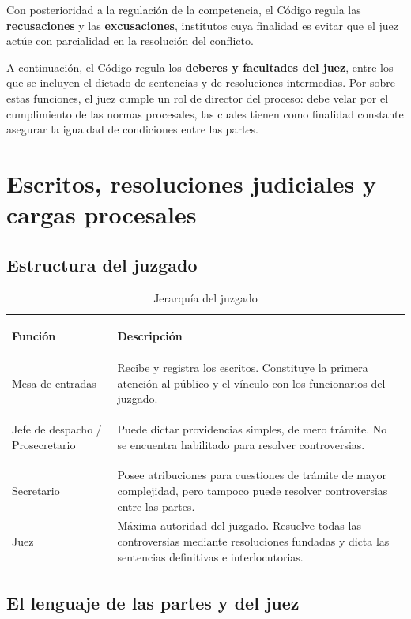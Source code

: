 \documentclass[12pt,oneside]{book}
\begin{document}
Con posterioridad a la regulación de la competencia, el Código regula las \textbf{recusaciones} y las \textbf{excusaciones}, institutos cuya finalidad es evitar que el juez actúe con parcialidad en la resolución del conflicto.

A continuación, el Código regula los \textbf{deberes y facultades del juez}, entre los que se incluyen el dictado de sentencias y de resoluciones intermedias. Por sobre estas funciones, el juez cumple un rol de director del proceso: debe velar por el cumplimiento de las normas procesales, las cuales tienen como finalidad constante asegurar la igualdad de condiciones entre las partes.

\section{Escritos, resoluciones judiciales y cargas procesales}

\subsection{Estructura del juzgado}

\begin{table}[H]
\centering
\caption{Jerarquía del juzgado}
\begin{tabularx}{\textwidth}{>{\bfseries\raggedright\arraybackslash}p{} X}
\toprule
Función & Descripción \\
\midrule
Mesa de entradas & Recibe y registra los escritos. Constituye la primera atención al público y el vínculo con los funcionarios del juzgado. \\
Jefe de despacho / Prosecretario & Puede dictar providencias simples, de mero trámite. No se encuentra habilitado para resolver controversias. \\
Secretario & Posee atribuciones para cuestiones de trámite de mayor complejidad, pero tampoco puede resolver controversias entre las partes. \\
Juez & Máxima autoridad del juzgado. Resuelve todas las controversias mediante resoluciones fundadas y dicta las sentencias definitivas e interlocutorias. \\
\bottomrule
\end{tabularx}
\end{table}

\subsection{El lenguaje de las partes y del juez}
\end{document}
